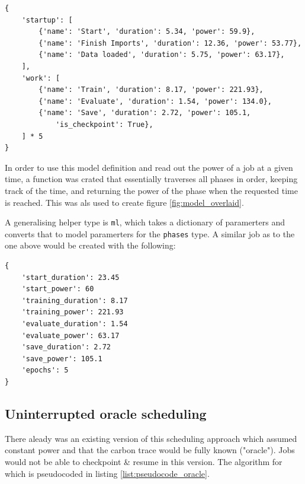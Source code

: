 \begin{lstlisting}[frame=single, numbers=none, caption={Simplified definition for a job similar to the experiment}, label={list:roberta_model_definition}, basicstyle=\ttfamily]
{
    'startup': [
        {'name': 'Start', 'duration': 5.34, 'power': 59.9},
        {'name': 'Finish Imports', 'duration': 12.36, 'power': 53.77},
        {'name': 'Data loaded', 'duration': 5.75, 'power': 63.17}, 
    ],
    'work': [
        {'name': 'Train', 'duration': 8.17, 'power': 221.93}, 
        {'name': 'Evaluate', 'duration': 1.54, 'power': 134.0}, 
        {'name': 'Save', 'duration': 2.72, 'power': 105.1,
            'is_checkpoint': True}, 
    ] * 5
}
\end{lstlisting}

In order to use this model definition and read out the power of a job at a given time, a function was crated that essentially traverses all phases in order, keeping track of the time, and returning the power of the phase when the requested time is reached. 
This was als used to create figure \ref{fig:model_overlaid}.

A generalising helper type is \verb|ml|, which takes a dictionary of paramerters and converts that to model paramerters for the \verb|phases| type. A similar job as to the one above would be created with the following:

\begin{lstlisting}[frame=single, numbers=none, caption={Generic model definition for machine learning jobs}, label={list:roberta_model_definition_generic}, basicstyle=\ttfamily]
{
    'start_duration': 23.45
    'start_power': 60
    'training_duration': 8.17
    'training_power': 221.93
    'evaluate_duration': 1.54
    'evaluate_power': 63.17
    'save_duration': 2.72
    'save_power': 105.1
    'epochs': 5
}
\end{lstlisting}

\subsection{Uninterrupted oracle scheduling}

There aleady was an existing version of this scheduling approach which assumed constant power and that the carbon trace would be fully known ("oracle"). 
Jobs would not be able to checkpoint \& resume in this version.
The algorithm for which is pseudocoded in listing \ref{list:pseudocode_oracle}.

